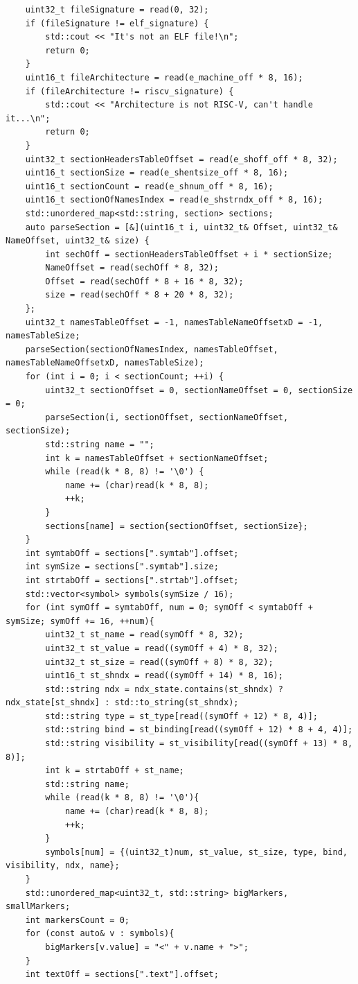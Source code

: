 \documentclass{article}
\begin{document}
\begin{lstlisting}
	uint32_t fileSignature = read(0, 32);
	if (fileSignature != elf_signature) {
		std::cout << "It's not an ELF file!\n";
		return 0;
	}
	uint16_t fileArchitecture = read(e_machine_off * 8, 16);
	if (fileArchitecture != riscv_signature) {
		std::cout << "Architecture is not RISC-V, can't handle it...\n";
		return 0;
	}
	uint32_t sectionHeadersTableOffset = read(e_shoff_off * 8, 32);
	uint16_t sectionSize = read(e_shentsize_off * 8, 16);
	uint16_t sectionCount = read(e_shnum_off * 8, 16);
	uint16_t sectionOfNamesIndex = read(e_shstrndx_off * 8, 16);
	std::unordered_map<std::string, section> sections;
	auto parseSection = [&](uint16_t i, uint32_t& Offset, uint32_t& NameOffset, uint32_t& size) {
		int sechOff = sectionHeadersTableOffset + i * sectionSize;
		NameOffset = read(sechOff * 8, 32);
		Offset = read(sechOff * 8 + 16 * 8, 32);
		size = read(sechOff * 8 + 20 * 8, 32);
	};
	uint32_t namesTableOffset = -1, namesTableNameOffsetxD = -1, namesTableSize;
	parseSection(sectionOfNamesIndex, namesTableOffset, namesTableNameOffsetxD, namesTableSize);
	for (int i = 0; i < sectionCount; ++i) {
		uint32_t sectionOffset = 0, sectionNameOffset = 0, sectionSize = 0;
		parseSection(i, sectionOffset, sectionNameOffset, sectionSize);
		std::string name = "";
		int k = namesTableOffset + sectionNameOffset;
		while (read(k * 8, 8) != '\0') {
			name += (char)read(k * 8, 8);
			++k;
		}
		sections[name] = section{sectionOffset, sectionSize};
	}
	int symtabOff = sections[".symtab"].offset;
	int symSize = sections[".symtab"].size;
	int strtabOff = sections[".strtab"].offset;
	std::vector<symbol> symbols(symSize / 16);
	for (int symOff = symtabOff, num = 0; symOff < symtabOff + symSize; symOff += 16, ++num){
		uint32_t st_name = read(symOff * 8, 32);
		uint32_t st_value = read((symOff + 4) * 8, 32);
		uint32_t st_size = read((symOff + 8) * 8, 32);
		uint16_t st_shndx = read((symOff + 14) * 8, 16);
		std::string ndx = ndx_state.contains(st_shndx) ? ndx_state[st_shndx] : std::to_string(st_shndx);
		std::string type = st_type[read((symOff + 12) * 8, 4)];
		std::string bind = st_binding[read((symOff + 12) * 8 + 4, 4)];
		std::string visibility = st_visibility[read((symOff + 13) * 8, 8)];
		int k = strtabOff + st_name;
		std::string name;
		while (read(k * 8, 8) != '\0'){
			name += (char)read(k * 8, 8);
			++k;
		}
		symbols[num] = {(uint32_t)num, st_value, st_size, type, bind, visibility, ndx, name};
	}
	std::unordered_map<uint32_t, std::string> bigMarkers, smallMarkers;
	int markersCount = 0;
	for (const auto& v : symbols){
		bigMarkers[v.value] = "<" + v.name + ">";
	}
	int textOff = sections[".text"].offset;

\end{lstlisting}
\end{document}
